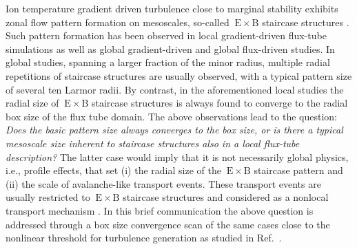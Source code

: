 \documentclass[aip, amsmath, amssymb, reprint, twocolumn, floatfix]{revtex4-1}
\newcommand{\exb}{\mathrm{\:E}\times\mathrm{B}}
\begin{document}
Ion temperature gradient driven turbulence close to marginal stability exhibits zonal flow pattern formation on mesoscales, so-called $\exb$ staircase structures \cite{Pradalier2010}.
Such pattern formation has been observed in local gradient-driven flux-tube simulations \cite{Peeters2016, Weikl2017, Rath2021} as well as global gradient-driven \cite{McMillan2009, Villard2013, Seo2022} and global flux-driven \cite{Pradalier2010, Pradalier2015, Wang2020, Kim2022, Kishimoto2023} studies. 
In global studies, spanning a larger fraction of the minor radius, multiple radial repetitions of staircase structures are usually observed, with a typical pattern size of several ten Larmor radii.
By contrast, in the aforementioned local studies the radial size of $\exb$ staircase structures is always found to converge to the radial box size of the flux tube domain.
The above observations lead to the question: 
\textit{Does the basic pattern size always converges to the box size, or is there a typical mesoscale size inherent to staircase structures also in a local flux-tube description?}
The latter case would imply that it is not necessarily global physics, i.e., profile effects, that set (i) the radial size of the $\exb$ staircase pattern and (ii) the scale of avalanche-like transport events. These transport events are usually restricted to $\exb$ staircase structures and considered as a nonlocal transport mechanism \cite{Pradalier2010}. 
In this brief communication the above question is addressed through a box size convergence scan of the same cases close to the nonlinear threshold for turbulence generation as studied in Ref.~.\bigskip

\end{document}
